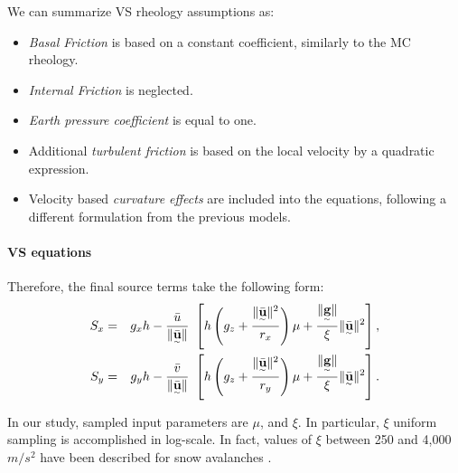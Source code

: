 \documentclass{article}
\begin{document}
We can summarize VS rheology assumptions as:
\begin{itemize}
\item \textit{Basal Friction} is based on a constant coefficient, similarly to the MC rheology.

\item \textit{Internal Friction} is neglected.

\item \textit{Earth pressure coefficient} is equal to one.

\item Additional \textit{turbulent friction} is based on the local velocity by a quadratic expression.

\item Velocity based \textit{curvature effects} are included into the equations, following a different formulation from the previous models.
\end{itemize}


\paragraph{VS equations} Therefore, the final source terms take the following form:
\begin{eqnarray}
\label{eq:S_terms_VS}
S_{x} &=&  g_{x} h - \frac{\bar{u}}{\| \underset{^\sim}{\bar{\textbf u}}\|} \ \left[ h \left(g_{z} + \frac{\| \underset{^\sim}{\bar{\textbf u}} \|^2}{r_{x}} \right)\mu+ \frac{\| \underset{^\sim}{\textbf g} \|}{\xi}\| \underset{^\sim}{\bar{\textbf u}} \|^2\right], \nonumber \\
S_{y} &=& g_{y} h - \frac{\bar{v}}{\| \underset{^\sim}{\bar{\textbf u}}\|} \ \left[ h \left(g_{z} + \frac{\| \underset{^\sim}{\bar{\textbf u}} \|^2}{r_{y}} \right)\mu+ \frac{\| \underset{^\sim}{\textbf g} \|}{\xi}\| \underset{^\sim}{\bar{\textbf u}} \|^2\right].
\end{eqnarray}

In our study, sampled input parameters are $\mu$, and $\xi$. In particular, $\xi$ uniform sampling is accomplished in log-scale. In fact, values of $\xi$ between 250 and 4,000 $m/s^2$ have been described for snow avalanches \citep{Salm1993,Bartelt1999,Gruber2007}.
\end{document}
